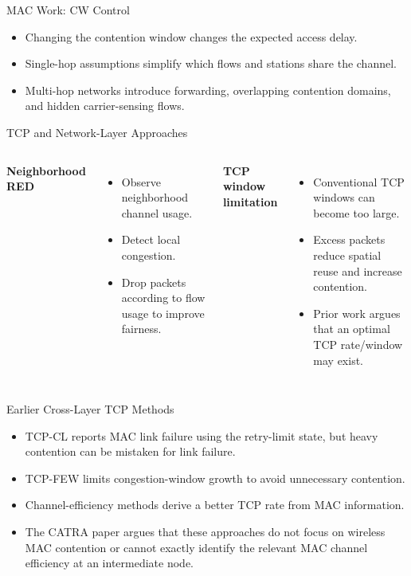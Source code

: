 \begin{frame}{MAC Work: CW Control}
\begin{itemize}
\item Changing the contention window changes the expected access delay.
\item Single-hop assumptions simplify which flows and stations share the channel.
\item Multi-hop networks introduce forwarding, overlapping contention domains, and hidden carrier-sensing flows.
\end{itemize}
\end{frame}

\begin{frame}{TCP and Network-Layer Approaches}
\begin{columns}[T,onlytextwidth]
\textbf{Neighborhood RED}
\begin{itemize}
\item Observe neighborhood channel usage.
\item Detect local congestion.
\item Drop packets according to flow usage to improve fairness.
\end{itemize}
\textbf{TCP window limitation}
\begin{itemize}
\item Conventional TCP windows can become too large.
\item Excess packets reduce spatial reuse and increase contention.
\item Prior work argues that an optimal TCP rate/window may exist.
\end{itemize}
\end{columns}
\end{frame}

\begin{frame}{Earlier Cross-Layer TCP Methods}
\begin{itemize}
\item TCP-CL reports MAC link failure using the retry-limit state, but heavy contention can be mistaken for link failure.
\item TCP-FEW limits congestion-window growth to avoid unnecessary contention.
\item Channel-efficiency methods derive a better TCP rate from MAC information.
\item The CATRA paper argues that these approaches do not focus on wireless MAC contention or cannot exactly identify the relevant MAC channel efficiency at an intermediate node.
\end{itemize}
\vspace{0.35cm}
\end{frame}

